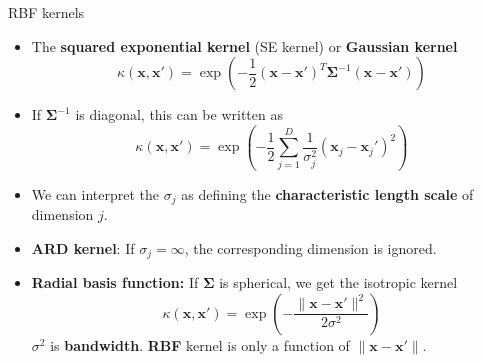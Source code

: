 \documentclass[10pt,mathserif]{beamer}
\begin{document}
\begin{frame}{RBF kernels}
\begin{itemize}
    \item The \textbf{squared exponential kernel} (SE kernel) or \textbf{Gaussian kernel}
    \begin{equation*}
        \kappa (\bm{x}, \bm{x'}) = \exp(-\frac{1}{2}(\bm{x}-\bm{x'})^T \bm{\Sigma}^{-1} (\bm{x}-\bm{x'}))
    \end{equation*}
    \item If $\bm{\Sigma}^{-1}$ is diagonal, this can be written as
    \begin{equation*}
        \kappa(\bm{x}, \bm{x'}) = \exp(-\frac{1}{2} \sum_{j=1}^D \frac{1}{\sigma^2_j }(\bm{x}_j - \bm{x}_j')^2)
    \end{equation*}
    \item We can interpret the $\sigma_j$ as defining the \textbf{characteristic length scale} of dimension $j$. 
    \item \textbf{ARD kernel}: If $\sigma_j = \infty$, the corresponding dimension is ignored.
    \item \textbf{Radial basis function:} If $\bm{\Sigma}$ is spherical, we get the isotropic kernel
    \begin{equation*}
        \kappa(\bm{x}, \bm{x'}) = \exp(-\frac{\|\bm{x}-\bm{x'}\|^2}{2\sigma^2} )
    \end{equation*}
    $\sigma^2$ is \textbf{bandwidth}. \textbf{RBF} kernel is only a function of $\|\bm{x}-\bm{x'}\|$.
\end{itemize}
\end{frame}
\end{document}
